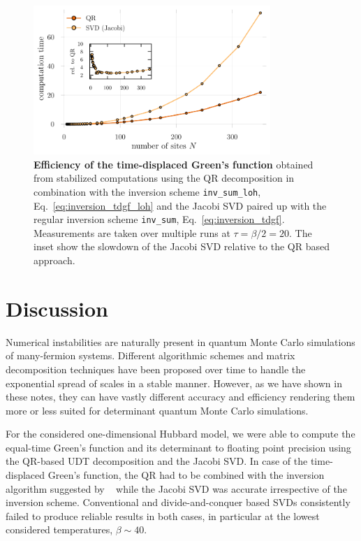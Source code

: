 \documentclass[submission, Phys]{SciPost}
\begin{document}
\begin{figure}
	\centering
	\includegraphics[width=0.8\textwidth]{figures/benchmark_jacobi_vs_qr_tdgf.pdf}
	\caption{\textbf{Efficiency of the time-displaced Green's function} obtained from stabilized computations using the QR decomposition in combination with the inversion scheme \texttt{inv\_sum\_loh}, Eq.~\eqref{eq:inversion_tdgf_loh} and the Jacobi SVD paired up with the regular inversion scheme \texttt{inv\_sum}, Eq.~\eqref{eq:inversion_tdgf}. Measurements are taken over multiple runs at $\tau = \beta/2 = 20$. The inset show the slowdown of the Jacobi SVD relative to the QR based approach. \label{fig:tdgf_benchmark}}
\end{figure}

\section{Discussion}\label{sec:discussion}

Numerical instabilities are naturally present in quantum Monte Carlo simulations of many-fermion systems. Different algorithmic schemes and matrix decomposition techniques have been proposed over time to handle the exponential spread of scales in a stable manner. However, as we have shown in these notes, they can have vastly different accuracy and efficiency rendering them more or less suited for determinant quantum Monte Carlo simulations.

For the considered one-dimensional Hubbard model, we were able to compute the equal-time Green's function and its determinant to floating point precision using the QR-based UDT decomposition and the Jacobi SVD. In case of the time-displaced Green's function, the QR had to be combined with the inversion algorithm suggested by ~\cite{Loh1989} while the Jacobi SVD was accurate irrespective of the inversion scheme. Conventional and divide-and-conquer based SVDs consistently failed to produce reliable results in both cases, in particular at the lowest considered temperatures, $\beta \sim 40$.
\end{document}
